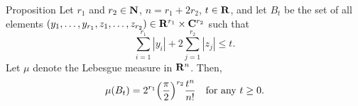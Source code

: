 \clearpage
{}

\begin{statement}{Proposition}
Let $r_{1}$ and $r_{2}\in\mathbf{N}$, $n=r_{1}+2r_{2}$, $t\in\mathbf{R}$, and let $B_{t}$ be
the set of all elements
$(y_{1},\ldots,y_{r_{1}},z_{1},\ldots,z_{r_{2}})\in
\mathbf{R}^{r_{1}}\times\mathbf{C}^{r_{2}}$ such that
\begin{equation}
\sum_{i=1}^{r_{1}}|y_{i}|+2\sum_{j=1}^{r_{2}}|z_{j}|\leq t.
\label{eq:IV.A.1}
\end{equation}
Let $\mu$ denote the Lebesgue measure in $\mathbf{R}^{n}$. Then,
\begin{equation}
\mu(B_{t})=2^{r_{1}}\Bigl(\frac{\pi}{2}\Bigr)^{r_{2}}\frac{t^{n}}{n!}
\quad\text{for any }t\geq0.
\label{eq:IV.A.2}
\end{equation}
\end{statement}

